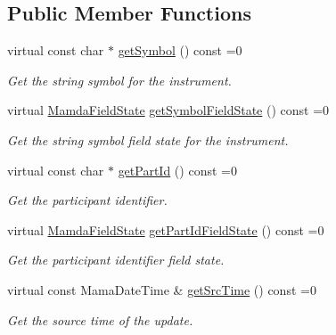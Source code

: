 \subsection*{Public Member Functions}
\begin{CompactItemize}
\item 
virtual const char $\ast$ \hyperlink{classWombat_1_1MamdaBasicRecap_79784f420fdf399a3716a9919ab592e8}{get\-Symbol} () const =0
\begin{CompactList}\small\item\em Get the string symbol for the instrument. \item\end{CompactList}\item 
virtual \hyperlink{namespaceWombat_93aac974f2ab713554fd12a1fa3b7d2a}{Mamda\-Field\-State} \hyperlink{classWombat_1_1MamdaBasicRecap_95a917a831265cdc29aa0e28d366108a}{get\-Symbol\-Field\-State} () const =0
\begin{CompactList}\small\item\em Get the string symbol field state for the instrument. \item\end{CompactList}\item 
virtual const char $\ast$ \hyperlink{classWombat_1_1MamdaBasicRecap_9aaa6f48d5e0bf04f98125378525241d}{get\-Part\-Id} () const =0
\begin{CompactList}\small\item\em Get the participant identifier. \item\end{CompactList}\item 
virtual \hyperlink{namespaceWombat_93aac974f2ab713554fd12a1fa3b7d2a}{Mamda\-Field\-State} \hyperlink{classWombat_1_1MamdaBasicRecap_97e4612d57ce6387e6414b00b201e242}{get\-Part\-Id\-Field\-State} () const =0
\begin{CompactList}\small\item\em Get the participant identifier field state. \item\end{CompactList}\item 
virtual const Mama\-Date\-Time \& \hyperlink{classWombat_1_1MamdaBasicRecap_ad502f098385594aa2c3395e1603a93f}{get\-Src\-Time} () const =0
\begin{CompactList}\small\item\em Get the source time of the update. \item\end{CompactList}\item 

\end{CompactItemize}
